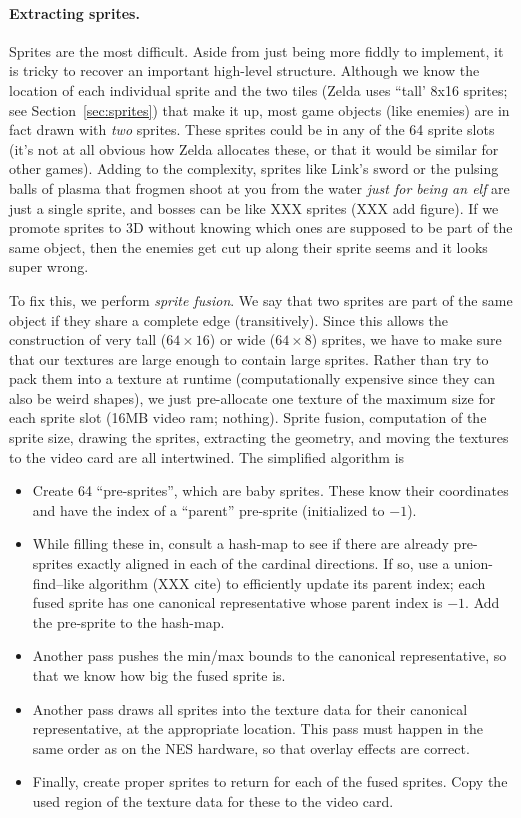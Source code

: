 \documentclass[twocolumn]{article}
\begin{document}
\paragraph{Extracting sprites.}
Sprites are the most difficult. Aside from just being more fiddly to
implement, it is tricky to recover an important high-level structure.
Although we know the location of each individual sprite and the two tiles
(Zelda uses ``tall' 8x16 sprites; see Section~\ref{sec:sprites}) that
make it up, most game objects (like enemies) are in fact drawn with
{\it two} sprites. These sprites could be in any of the 64 sprite
slots (it's not at all obvious how Zelda allocates these, or that it
would be similar for other games). Adding to the complexity, sprites
like Link's sword or the pulsing balls of plasma that frogmen shoot
at you from the water {\it just for being an elf} are just a single
sprite, and bosses can be like XXX sprites (XXX add figure). If we
promote sprites to 3D without knowing which ones are supposed to be
part of the same object, then the enemies get cut up along their
sprite seems and it looks super wrong.

To fix this, we perform {\it sprite fusion}. We say that two sprites
are part of the same object if they share a complete edge
(transitively). Since this allows the construction of very tall ($64
\times 16$) or wide ($64 \times 8$) sprites, we have to make sure that
our textures are large enough to contain large sprites. Rather than
try to pack them into a texture at runtime (computationally expensive
since they can also be weird shapes), we just pre-allocate one texture
of the maximum size for each sprite slot (16MB video ram; nothing).
Sprite fusion, computation of the sprite size, drawing the sprites,
extracting the geometry, and moving the textures to the video card are
all intertwined. The simplified algorithm is

\begin{itemize}
\item Create 64 ``pre-sprites'', which are baby sprites. These know
  their coordinates and have the index of a ``parent'' pre-sprite
  (initialized to $-1$).
\item While filling these in, consult a hash-map to see if there are
  already pre-sprites exactly aligned in each of the cardinal
  directions. If so, use a union-find--like algorithm (XXX cite)
  to efficiently update its parent index; each fused sprite has one
  canonical representative whose parent index is $-1$. Add the
  pre-sprite to the hash-map.
\item Another pass pushes the min/max bounds to the canonical representative,
  so that we know how big the fused sprite is.
\item Another pass draws all sprites into the texture data for their
  canonical representative, at the appropriate location. This pass must
  happen in the same order as on the NES hardware, so that overlay effects
  are correct.
\item Finally, create proper sprites to return for each of the fused sprites.
  Copy the used region of the texture data for these to the video card.
\end{itemize}
\end{document}
